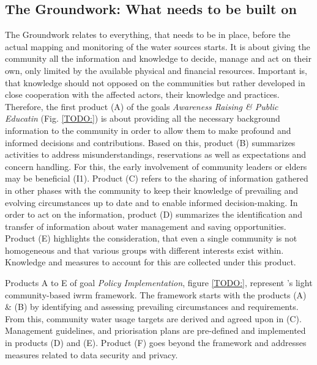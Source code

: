 
\subsection{The Groundwork: What needs to be built on}\label{subsubsec:groundwork}%
The Groundwork relates to everything, that needs to be in place, before the actual mapping and monitoring of the water sources starts. It is about giving the community all the information and knowledge to decide, manage and act on their own, only limited by the available physical and financial resources. Important is, that knowledge should not opposed on the communities but rather developed in close cooperation with the affected actors, their knowledge and practices. Therefore, the first product (A) of the goals \textit{Awareness Raising \& Public Educatin} (Fig. \ref*{TODO:}) is about providing all the necessary background information to the community in order to allow them to make profound and informed decisions and contributions. Based on this, product (B) summarizes activities to address misunderstandings, reservations as well as expectations and concern handling. For this, the early involvement of community leaders or elders may be beneficial (I1). Product (C) refers to the sharing of information gathered in other phases with the community to keep their knowledge of prevailing and evolving circumstances up to date and to enable informed decision-making. In order to act on the information, product (D) summarizes the identification and transfer of information about water management and saving opportunities. Product (E) highlights the consideration, that even a single community is not homogeneous and that various groups with different interests exist within. Knowledge and measures to account for this are collected under this product.\newline


Products A to E of goal \textit{Policy Implementation}, figure \ref*{TODO:}, represent \autocite{dayCommunitybasedWaterResources2009}'s light community-based \acrshort{iwrm} framework. The framework starts with the products (A) \& (B) by identifying and assessing prevailing circumstances and requirements. From this, community water usage targets are derived and agreed upon in (C). Management guidelines, and priorisation plans are pre-defined and implemented in products (D) and (E). Product (F) goes beyond the framework and addresses measures related to data security and privacy.


